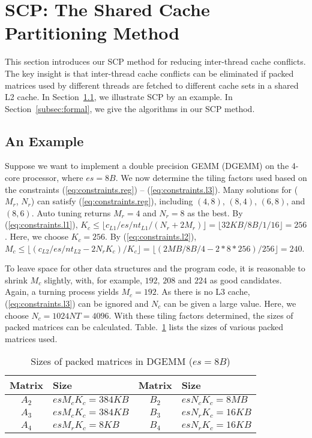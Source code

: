 \section{SCP: The Shared Cache Partitioning Method}\label{sec:scp}

This section introduces our SCP method for reducing
inter-thread cache conflicts.
The key insight is that inter-thread cache conflicts can be eliminated
if packed matrices used by different threads are fetched to different cache sets in a shared L2 cache.
In Section~\ref{subsec:example}, we illustrate 
SCP by an example.  In Section~\ref{subsec:formal},
we give the algorithms in our SCP method.

\subsection{An Example}\label{subsec:example}


Suppose we want to implement a double precision GEMM (DGEMM) on
the 4-core processor, where $es=8B$.
We now determine the tiling factors used based on
the constraints (\ref{eq:constraints.reg}) -- (\ref{eq:constraints.l3}).
Many solutions for ($M_r$, $N_r$) can satisfy (\ref{eq:constraints.reg}), including
$(4,8)$, $(8,4)$, $(6,8)$, and $(8,6)$.
Auto tuning returns $M_r = 4$ and $N_r = 8$ as the best.
By (\ref{eq:constraints.l1}),
$K_c \le \lfloor c_{L1}/es/nt_{L1}/(N_r + 2 M_r) \rfloor = \lfloor 32KB/8B/1/16 \rfloor = 256$.
Here, we choose $K_c=256$.
By (\ref{eq:constraints.l2}),
$M_c \le \lfloor (c_{L2}/es/nt_{L2} - 2 N_r K_c )/ K_c \rfloor =
\lfloor (2MB/8B/4 - 2*8*256)/256 \rfloor = 240$.

To leave space for other data structures and the program code,
it is reasonable to shrink $M_c$ slightly, with,
for example, $192$, $208$ and $224$ as good
candidates. Again, a turning process yields
$M_c = 192$.
As there is no L3 cache, (\ref{eq:constraints.l3}) can be ignored
and $N_c$ can be given a large value.
Here, we choose $N_c = 1024NT = 4096$.
With these tiling factors determined, the sizes of packed matrices
can be calculated. Table.~\ref{tab:msizes} lists
the sizes of various packed matrices used.

\begin{table}
  \centering
  \caption{Sizes of packed matrices in DGEMM ($es = 8B$)}
  \label{tab:msizes}
  \begin{tabular}{cl|cl}
    \toprule
    Matrix & Size & Matrix & Size \\
    \midrule
    $A_2$ & $es M_c K_c = 384KB$ & $B_2$ & $es N_c K_c = 8MB$ \\
    $A_3$ & $es M_c K_c = 384KB$ & $B_3$ & $es N_r K_c = 16KB$ \\
    $A_4$ & $es M_r K_c = 8KB$   & $B_4$ & $es N_r K_c = 16KB$ \\
    \bottomrule
  \end{tabular}
\end{table}

